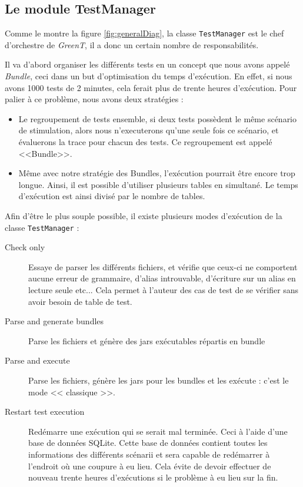 \subsection{Le module TestManager}\label{testManager}
Comme le montre la figure \ref{fig:generalDiag}, la classe \texttt{TestManager} est le chef d'orchestre de \textit{GreenT}, il a donc un certain nombre de responsabilités. 

Il va d'abord organiser les différents tests en un concept que nous avons appelé \textit{Bundle}, ceci dans un but d'optimisation du temps d'exécution. En effet, si nous avons 1000 tests de 2 minutes, cela ferait plus de trente heures d'exécution. Pour palier à ce problème, nous avons deux stratégies :
\begin{itemize}
	\item Le regroupement de tests ensemble, si deux tests possèdent le même scénario de stimulation, alors nous n'executerons qu'une seule fois ce scénario, et évaluerons la trace pour chacun des tests. Ce regroupement est appelé <<Bundle>>.
	\item Même avec notre stratégie des Bundles, l'exécution pourrait être encore trop longue. Ainsi, il est possible d'utiliser plusieurs tables en simultané. Le temps d'exécution est ainsi divisé par le nombre de tables. 
\end{itemize}

Afin d'être le plus souple possible, il existe plusieurs modes d'exécution de la classe \texttt{TestManager} : 
\begin{description}
	\item[Check only] Essaye de parser les différents fichiers, et vérifie que ceux-ci ne comportent aucune erreur de grammaire, d'alias introuvable, d'écriture sur un alias en lecture seule etc... Cela permet à l'auteur des cas de test de se vérifier sans avoir besoin de table de test.
	\item[Parse and generate bundles] Parse les fichiers et génère des jars exécutables répartis en bundle
	\item[Parse and execute] Parse les fichiers, génère les jars pour les bundles et les exécute : c'est le mode << classique >>.
	\item[Restart test execution] Redémarre une exécution qui se serait mal terminée. Ceci à l'aide d'une base de données SQLite. Cette base de données contient toutes les informations des différents scénarii et sera capable de redémarrer à l'endroit où une coupure à eu lieu. Cela évite de devoir effectuer de nouveau trente heures d'exécutions si le problème à eu lieu sur la fin.
\end{description}

